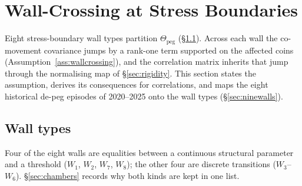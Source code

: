
\section{Wall-Crossing at Stress Boundaries}\label{sec:wall}
Eight stress-boundary wall types partition $\Theta_{\mathrm{peg}}$ (\S\ref{sec:walltypes}). Across each wall the co-movement covariance jumps by a rank-one term supported on the affected coins (Assumption~\ref{ass:wallcrossing}), and the correlation matrix inherits that jump through the normalising map of \S\ref{sec:rigidity}. This section states the assumption, derives its consequences for correlations, and maps the eight historical de-peg episodes of 2020--2025 onto the wall types (\S\ref{sec:ninewalls}).

\subsection{Wall types}\label{sec:walltypes}
Four of the eight walls are equalities between a continuous structural parameter and a threshold ($W_1$, $W_2$, $W_7$, $W_8$); the other four are discrete transitions ($W_3$--$W_6$). \S\ref{sec:chambers} records why both kinds are kept in one list.
